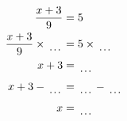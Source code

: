\documentclass[12pt]{article}
\begin{document}
\begin{multicols}{2}
\begin{minipage}[t]{0.45\textwidth}
    \raggedright %
    \begin{align*} %
        \frac{x + 3}{9} &= 5\\
        \frac{x + 3}{9} \times\dotuline{\hspace{5mm}} &= 5 \times\dotuline{\hspace{5mm}}\\
        x + 3 &= \dotuline{\hspace{5mm}}\\
        x + 3 - \dotuline{\hspace{5mm}} &= \dotuline{\hspace{5mm}} - \dotuline{\hspace{5mm}}\\
        x &= \dotuline{\hspace{5mm}}\\
    \end{align*}
\end{minipage}\newpage
    
\end{multicols}
\end{document}
